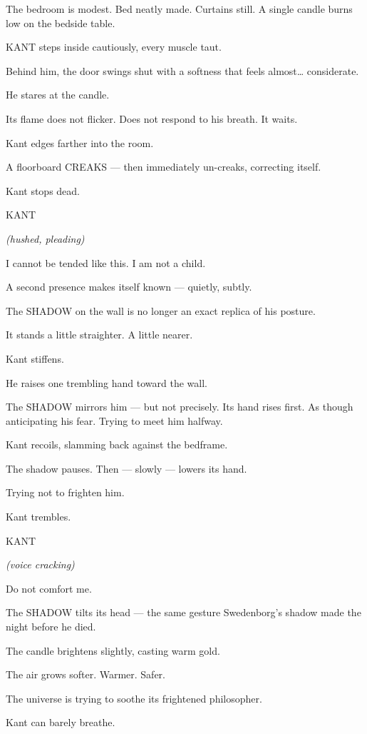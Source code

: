 \documentclass[12pt]{article}
\newenvironment{dialogue}[1]{%
  \vspace{0.8\baselineskip}%
  \noindent\hspace*{2.3in}\textsc{#1}\par%
  \noindent\hspace*{1.5in}\begin{minipage}[t]{4.5in}%
}{%
  \end{minipage}\par%
}
\newcommand{\paren}[1]{%
  \noindent\hspace*{1.8in}\textit{(#1)}\par%
}
\begin{document}
The bedroom is modest.
Bed neatly made.
Curtains still.
A single candle burns low on the bedside table.

KANT steps inside cautiously, every muscle taut.

Behind him, the door swings shut
with a softness that feels almost… considerate.

He stares at the candle.

Its flame does not flicker.
Does not respond to his breath.
It waits.

Kant edges farther into the room.

A floorboard CREAKS —
then immediately un-creaks, correcting itself.

Kant stops dead.

\begin{dialogue}{KANT}
\paren{hushed, pleading}
I cannot be tended like this.
I am not a child.
\end{dialogue}

A second presence makes itself known — quietly, subtly.

The SHADOW on the wall is no longer an exact replica of his posture.

It stands a little straighter.
A little nearer.

Kant stiffens.

He raises one trembling hand toward the wall.

The SHADOW mirrors him —
but not precisely.
Its hand rises first.
As though anticipating his fear.
Trying to meet him halfway.

Kant recoils, slamming back against the bedframe.

The shadow pauses.
Then — slowly — lowers its hand.

Trying not to frighten him.

Kant trembles.

\begin{dialogue}{KANT}
\paren{voice cracking}
Do not comfort me.
\end{dialogue}

The SHADOW tilts its head —
the same gesture Swedenborg’s shadow made
the night before he died.

The candle brightens slightly, casting warm gold.

The air grows softer.
Warmer.
Safer.

The universe is trying to soothe its frightened philosopher.

Kant can barely breathe.
\end{document}
